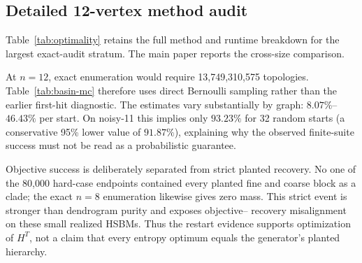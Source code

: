 \subsection{Detailed 12-vertex method audit}
Table~\ref{tab:optimality} retains the full method and runtime breakdown for the
largest exact-audit stratum. The main paper reports the cross-size comparison.



At $n=12$, exact enumeration would require 13,749,310,575 topologies.
Table~\ref{tab:basin-mc} therefore uses direct Bernoulli sampling rather than
the earlier first-hit diagnostic. The estimates vary substantially by graph:
$8.07\%$--$46.43\%$ per start. On noisy-11 this implies only $93.23\%$ for 32
random starts (a conservative 95\% lower value of $91.87\%$), explaining why
the observed finite-suite success must not be read as a probabilistic
guarantee.



Objective success is deliberately separated from strict planted recovery.
No one of the 80,000 hard-case endpoints contained every planted fine and
coarse block as a clade; the exact $n=8$ enumeration likewise gives zero mass.
This strict event is stronger than dendrogram purity and exposes objective--
recovery misalignment on these small realized HSBMs. Thus the restart evidence
supports optimization of $H^T$, not a claim that every entropy optimum equals
the generator's planted hierarchy.
